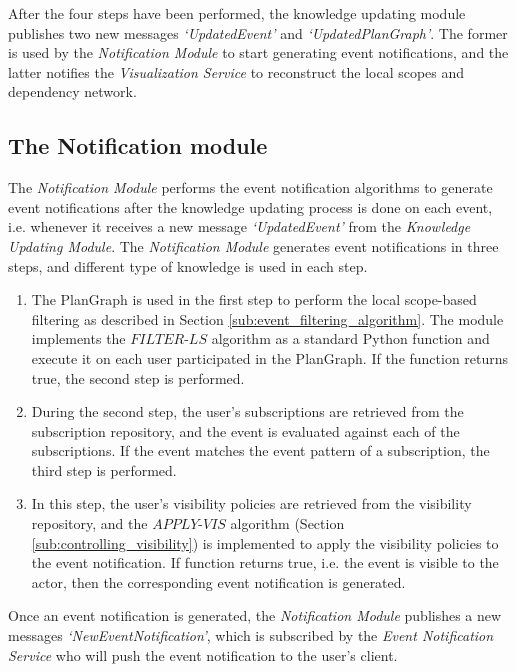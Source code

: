 After the four steps have been performed, the knowledge updating module publishes two new messages \emph{`UpdatedEvent'} and \emph{`UpdatedPlanGraph'}. The former is used by the \emph{Notification Module} to start generating event notifications, and the latter notifies the \emph{Visualization Service} to reconstruct the local scopes and dependency network.

\subsection{The Notification module} %
\label{sub:the_notification_module}
The \emph{Notification Module} performs the event notification algorithms to generate event notifications after the knowledge updating process is done on each event, i.e. whenever it receives a new message \emph{`UpdatedEvent'} from the \emph{Knowledge Updating Module}. The \emph{Notification Module} generates event notifications in three steps, and different type of knowledge is used in each step.

\begin{enumerate}
	\item The PlanGraph is used in the first step to perform the local scope-based filtering as described in Section \ref{sub:event_filtering_algorithm}. The module implements the $FILTER\textrm{-}LS$ algorithm as a standard Python function and execute it on each user participated in the PlanGraph. If the function returns true, the second step is performed.
	\item During the second step, the user's subscriptions are retrieved from the subscription repository, and the event is evaluated against each of the subscriptions. If the event matches the event pattern of a subscription, the third step is performed.
	\item In this step, the user's visibility policies are retrieved from the visibility repository, and the $APPLY\textrm{-}VIS$ algorithm (Section \ref{sub:controlling_visibility}) is implemented to apply the visibility policies to the event notification. If function returns true, i.e. the event is visible to the actor, then the corresponding event notification is generated.
\end{enumerate}

Once an event notification is generated, the \emph{Notification Module} publishes a new messages \emph{`NewEventNotification'}, which is subscribed by the \emph{Event Notification Service} who will push the event notification to the user's client.


